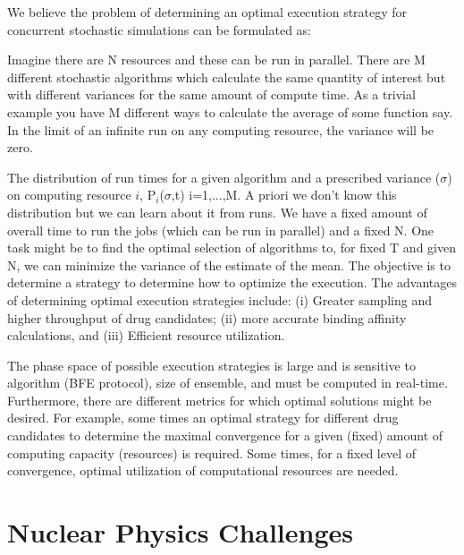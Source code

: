 \documentclass[11pt]{article}
\begin{document}
We believe the problem of determining an optimal execution strategy
for concurrent stochastic simulations can be formulated as:

Imagine there are N resources and these can be run in parallel. There are M
different stochastic algorithms which calculate the same quantity of interest
but with different variances for the same amount of compute time. As a trivial
example you have M different ways to calculate the average of some function
say.  In the limit of an infinite run on any computing resource, the variance
will be zero.  

The distribution of run times for a given algorithm and a prescribed variance
($\sigma$) on computing resource $i$, P$_i$($\sigma$,t) i=1,...,M. A priori we
don’t know this distribution but we can learn about it from runs. We have a
fixed amount of overall time to run the jobs (which can be run in parallel)
and a fixed N. One task might be to find the optimal selection of algorithms
to, for fixed T and given N, we can minimize the variance of the estimate of
the mean.  The objective is to determine a strategy to determine how to
optimize the execution. The advantages of determining optimal execution
strategies include: (i) Greater sampling and higher throughput of drug
candidates; (ii) more accurate binding affinity calculations, and (iii)
Efficient resource utilization.

 The phase space of
possible execution strategies is large and is sensitive to algorithm
(BFE protocol), size of ensemble, and must be computed in
real-time. Furthermore, there are different metrics for which optimal
solutions might be desired. For example, some times an optimal
strategy for different drug candidates to determine the maximal
convergence for a given (fixed) amount of computing capacity
(resources) is required. Some times, for a fixed level of convergence,
optimal utilization of computational resources are needed.

\section{Nuclear Physics Challenges}
 
\end{document}
